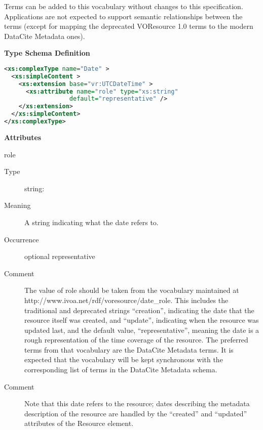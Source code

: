 \documentclass[11pt,a4paper]{ivoa}
\begin{document}
Terms can be added to this vocabulary without changes to this
specification.  Applications are not expected to support semantic
relationships between the terms (except for mapping the deprecated
VOResource 1.0 terms to the modern DataCite Metadata ones).

\begin{generated}
\begingroup
      	\renewcommand*\descriptionlabel[1]{%
      	\hbox to 5.5em{\emph{#1}\hfil}}\vspace{1ex}\noindent\textbf{ Type Schema Definition}

\begin{lstlisting}[language=XML,basicstyle=\footnotesize]
<xs:complexType name="Date" >
  <xs:simpleContent >
    <xs:extension base="vr:UTCDateTime" >
      <xs:attribute name="role" type="xs:string"
                  default="representative" />
    </xs:extension>
  </xs:simpleContent>
</xs:complexType>
\end{lstlisting}

\vspace{0.5ex}\noindent\textbf{ Attributes}

\begingroup\small\begin{bigdescription}
\item[role]
\begin{description}
\item[Type] string: 
\item[Meaning] 
                 A string indicating what the date refers to.  
               
\item[Occurrence] optional
representative
\item[Comment] 
               	The value of role should be taken from the vocabulary 
               	maintained at
               	http://www.ivoa.net/rdf/voresource/date\_role.
               	This includes the traditional and deprecated strings
                “creation”, indicating the date that the resource 
                itself was created, and “update”, indicating when the
                resource was updated last, and the default value,
                “representative”, meaning the date is a rough 
                representation of the time coverage of the resource.
                The preferred terms from that vocabulary are the DataCite
                Metadata terms.   It is expected that the vocabulary will 
                be kept synchronous with the corresponding list of terms
                in the DataCite Metadata schema.
               
\item[Comment] 
                 Note that this date refers to the resource; dates describing
                 the metadata description of the resource are handled by
                 the “created” and “updated” attributes of the Resource 
                 element. 
               
\end{description}


\end{bigdescription}\endgroup

\endgroup
\end{generated}
\end{document}
